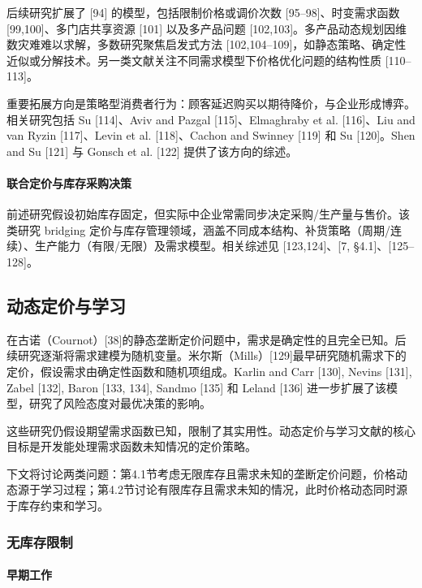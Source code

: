 后续研究扩展了 [94] 的模型，包括限制价格或调价次数 [95–98]、时变需求函数 [99,100]、多门店共享资源 [101] 以及多产品问题 [102,103]。多产品动态规划因维数灾难难以求解，多数研究聚焦启发式方法 [102,104–109]，如静态策略、确定性近似或分解技术。另一类文献关注不同需求模型下价格优化问题的结构性质 [110–113]。

重要拓展方向是策略型消费者行为：顾客延迟购买以期待降价，与企业形成博弈。相关研究包括 Su [114]、Aviv and Pazgal [115]、Elmaghraby et al. [116]、Liu and van Ryzin [117]、Levin et al. [118]、Cachon and Swinney [119] 和 Su [120]。Shen and Su [121] 与 Gonsch et al. [122] 提供了该方向的综述。

\paragraph{联合定价与库存采购决策}\label{jointly-determining-selling-prices-and-inventory-procurement}

前述研究假设初始库存固定，但实际中企业常需同步决定采购/生产量与售价。该类研究 bridging 定价与库存管理领域，涵盖不同成本结构、补货策略（周期/连续）、生产能力（有限/无限）及需求模型。相关综述见 [123,124]、[7, §4.1]、[125–128]。


\subsection{动态定价与学习}\label{dynamic-pricing-and-learning}

在古诺（Cournot）{[}38{]}的静态垄断定价问题中，需求是确定性的且完全已知。后续研究逐渐将需求建模为随机变量。米尔斯（Mills）{[}129{]}最早研究随机需求下的定价，假设需求由确定性函数和随机项组成。Karlin and Carr {[}130{]}, Nevins {[}131{]}, Zabel {[}132{]}, Baron {[}133, 134{]}, Sandmo {[}135{]} 和 Leland {[}136{]} 进一步扩展了该模型，研究了风险态度对最优决策的影响。

这些研究仍假设期望需求函数已知，限制了其实用性。动态定价与学习文献的核心目标是开发能处理需求函数未知情况的定价策略。

下文将讨论两类问题：第4.1节考虑无限库存且需求未知的垄断定价问题，价格动态源于学习过程；第4.2节讨论有限库存且需求未知的情况，此时价格动态同时源于库存约束和学习。

\subsubsection{无库存限制}\label{no-inventory-restrictions}

\paragraph{早期工作}\label{early-work}

